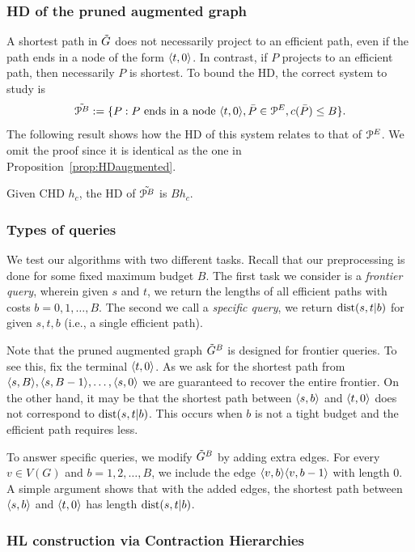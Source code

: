 \subsubsection{HD of the pruned augmented graph}

A shortest path in $\tilde G$ does not necessarily project to an efficient path, even if the path ends in a node of the form $\langle t,0\rangle$.
In contrast, if $P$ projects to an efficient path, then necessarily $P$ is shortest. 
To bound the HD, the correct system to study is
\[
\tilde{\mathcal{P}^B}:=\{P: P\text{ ends in a node }\langle t,0\rangle, \bar P\in \mathcal{P}^E, c(\bar P)\leq B \}.
\]
The following result shows how the HD of this system relates to that of $\mathcal{P}^E$.
We omit the proof since it is identical as the one in Proposition~\ref{prop:HDaugmented}.
\begin{proposition}
Given CHD $h_c$, the HD of $\tilde{\mathcal{P}^B}$ is $Bh_c$.
\end{proposition}

\subsubsection{Types of queries}

We test our algorithms with two different tasks.
Recall that our preprocessing is done for some fixed maximum budget $B$.
The first task we consider is a \emph{frontier query}, wherein given $s$ and $t$, we return the lengths of all efficient paths with costs $b=0,1,\ldots,B$.
The second we call a \emph{specific query}, we return $\mbox{dist}(s,t|b)$ for given $s,t,b$ (i.e., a single efficient path).

Note that the pruned augmented graph $\tilde G^B$ is designed for frontier queries.
To see this, fix the terminal $\langle t,0\rangle$.
As we ask for the shortest path from $\langle s,B\rangle,\langle s,B-1\rangle,\ldots,\langle s,0\rangle$ we are guaranteed to recover the entire frontier.
On the other hand, it may be that the shortest path between $\langle s,b\rangle$ and $\langle t,0\rangle$ does not correspond to $\mbox{dist}(s,t|b)$.
This occurs when $b$ is not a tight budget and the efficient path requires less.

To answer specific queries, we modify $\tilde G^B$ by adding extra edges.
For every $v\in V(G)$ and $b=1,2,\ldots,B$, we include the edge $\langle v,b\rangle\langle v,b-1\rangle$ with length $0$.
A simple argument shows that with the added edges, the shortest path between $\langle s,b\rangle$ and $\langle t,0\rangle$ has length $\mbox{dist}(s,t|b)$.

\subsubsection{HL construction via Contraction Hierarchies}


